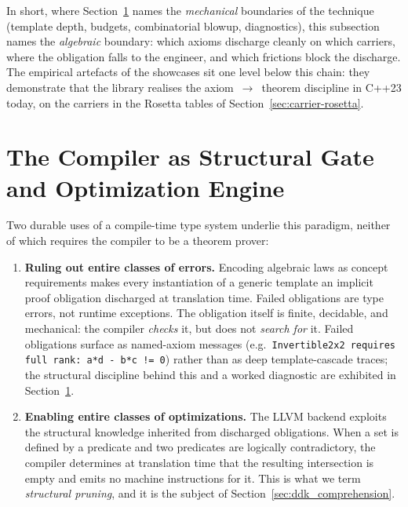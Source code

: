 \documentclass[11pt, a4paper]{article}
\begin{document}
In short, where Section~\ref{sec:compiler-wall} names the
\emph{mechanical} boundaries of the technique (template depth,
 budgets, combinatorial blowup, diagnostics),
this subsection names the \emph{algebraic} boundary: which axioms
discharge cleanly on which carriers, where the obligation falls to
the engineer, and which frictions block the discharge. The empirical
artefacts of the showcases sit one level below this chain: they
demonstrate that the library realises the axiom~$\to$~theorem
discipline in C++23 today, on the carriers in the Rosetta tables of
Section~\ref{sec:carrier-rosetta}.

\clearpage
\section{The Compiler as Structural Gate and Optimization Engine}
\label{sec:compiler-wall}

Two durable uses of a compile-time type system underlie this paradigm, neither
of which requires the compiler to be a theorem prover:

\begin{enumerate}
  \item \textbf{Ruling out entire classes of errors.}  Encoding algebraic laws as
        concept requirements makes every instantiation of a generic template an
        implicit proof obligation discharged at translation time.  Failed
        obligations are type errors, not runtime exceptions.  The obligation
        itself is finite, decidable, and mechanical: the compiler \emph{checks}
        it, but does not \emph{search for} it.  Failed obligations surface
        as named-axiom messages (e.g.\ \texttt{Invertible2x2 requires full
        rank: a*d - b*c != 0}) rather than as deep template-cascade
        traces; the structural discipline behind this and a worked
        diagnostic are exhibited in Section~\ref{sec:compiler-wall}.
  \item \textbf{Enabling entire classes of optimizations.}  The LLVM backend
        exploits the structural knowledge inherited from discharged obligations.
        When a set is defined by a predicate and two predicates are logically
        contradictory, the compiler determines at translation time that the
        resulting intersection is empty and emits no machine instructions for
        it.  This is what we term \emph{structural pruning}, and it is the
        subject of Section~\ref{sec:ddk_comprehension}.
\end{enumerate}
\end{document}
